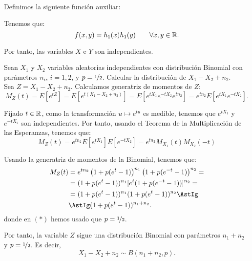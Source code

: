 \begin{ejercicio}
\begin{enumerate}
        Definimos la siguiente función auxiliar:

        Tenemos que:
        \begin{equation*}
            f(x,y)=h_1(x)h_1(y) \qquad \forall x,y\in \mathbb{R}.
        \end{equation*}

        Por tanto, las variables $X$ e $Y$ son independientes.
    \end{enumerate}
\end{ejercicio}

\begin{ejercicio}
    Sean $X_1$ y $X_2$ variables aleatorias independientes con distribución Binomial con parámetros $n_i$, $i = 1,2$, y $p = \nicefrac{1}{2}$. Calcular la distribución de $X_1 - X_2 + n_2$.\\

    Sea $Z=X_1-X_2+n_2$. Calculamos generatriz de momentos de $Z$:
    \begin{equation*}
        M_Z(t) = E[e^{tZ}] = E[e^{t(X_1-X_2+n_2)}] = E[e^{tX_1}e^{-tX_2}e^{tn_2}] = e^{tn_2}E[e^{tX_1}e^{-tX_2}].
    \end{equation*}

    Fijado $t\in \mathbb{R}$, como la transformación $u\mapsto e^{tu}$ es medible, tenemos que $e^{tX_1}$ y $e^{-tX_2}$ son independientes. Por tanto, usando el Teorema de la Multiplicación de las Esperanzas, tenemos que:
    \begin{equation*}
        M_Z(t) = e^{tn_2}E[e^{tX_1}]E[e^{-tX_2}] = e^{tn_2}M_{X_1}(t)M_{X_2}(-t)
    \end{equation*}

    Usando la generatriz de momentos de la Binomial, tenemos que:
    \begin{align*}
        M_Z(t) &= e^{tn_2}\left(1+p(e^t-1)\right)^{n_1}\left(1+p(e^{-t}-1)\right)^{n_2} =\\
        &=(1+p(e^t-1))^{n_1}[e^t(1+p(e^{-t}-1))]^{n_2}=\\
        &=(1+p(e^t-1))^{n_1}(1+p(e^{t}-1))^{n_2}
        \AstIg\\&\AstIg
        (1+p(e^t-1))^{n_1+n_2}.
    \end{align*}
    donde en $(\ast)$ hemos usado que $p=\nicefrac{1}{2}$.

    Por tanto, la variable $Z$ sigue una distribución Binomial con parámetros $n_1+n_2$ y $p=\nicefrac{1}{2}$. Es decir,
    \begin{equation*}
        X_1-X_2+n_2\sim B(n_1+n_2,p).
    \end{equation*}
\end{ejercicio}

